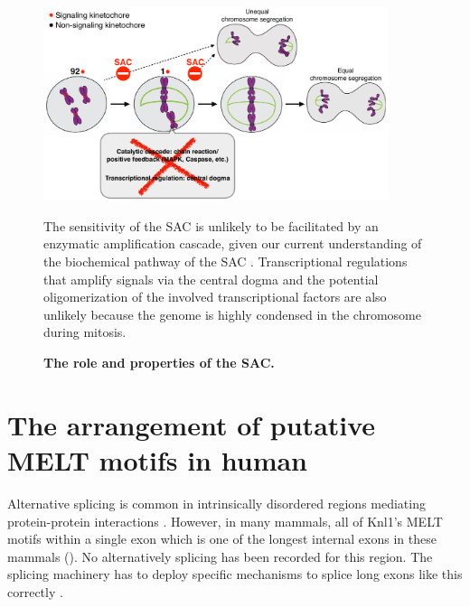 \begin{figure}
    \centering
    \includegraphics[width=0.9\textwidth]{chapters/figures/SACRole.pdf}
    \caption{\textbf{The role and properties of the SAC.}}
    \noindent\justifying The sensitivity of the SAC is unlikely to be facilitated by an enzymatic amplification cascade, given our current understanding of the biochemical pathway of the SAC \cite{InhibitorUltrasensitivity, Caspase}. Transcriptional regulations that amplify signals via the central dogma and the potential oligomerization of the involved transcriptional factors \cite{TFMultimerization} are also unlikely because the genome is highly condensed in the chromosome during mitosis.
    \label{SACRole}
\end{figure}

\section{The arrangement of putative MELT motifs in human }

Alternative splicing is common in intrinsically disordered regions mediating protein-protein interactions \cite{DisorderedRegionsAlternativeSplicing}. However, in many mammals, all of Knl1's MELT motifs within a single exon which is one of the longest internal exons in these mammals (). No alternatively splicing has been recorded for this region. The splicing machinery has to deploy specific mechanisms to splice long exons like this correctly \cite{InternalExon}.


